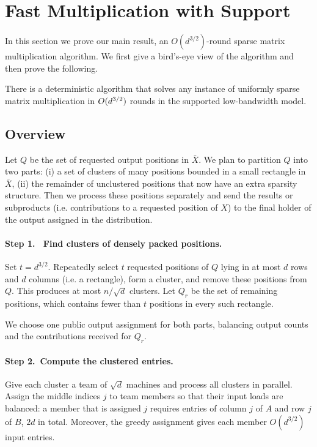 \section{Fast Multiplication with Support} \label{sec:ub}
In this section we prove our main result, an $O(d^{3/2})$-round sparse matrix multiplication algorithm. We first give a bird's-eye view of the algorithm and then prove the following.

\begin{theorem}\label{thm:fs-upper-bound}
	There is a deterministic algorithm that solves any instance of uniformly sparse matrix multiplication in $O(d^{3/2})$ rounds in the supported low-bandwidth model.
\end{theorem}

\subsection{Overview}
Let $Q$ be the set of requested output positions in $\bar{X}$. We plan to partition $Q$ into two parts: (i) a set of clusters of many positions bounded in a small rectangle in $\bar{X}$, (ii) the remainder of unclustered positions that now have an extra sparsity structure. Then we process these positions separately and send the results or subproducts (i.e. contributions to a requested position of $X$) to the final holder of the output assigned in the distribution.


\paragraph{Step 1.~ Find clusters of densely packed positions.}
Set $t=d^{3/2}$. Repeatedly select $t$ requested
positions of $Q$ lying in at most $d$ rows and $d$ columns (i.e. a rectangle), form a cluster, and remove these positions from $Q$.
This produces at most $n/\sqrt d$ clusters. Let $Q_r$ be the set of remaining
positions, which contains fewer than $t$ positions
in every such rectangle.

We choose one public output assignment for both parts, balancing
output counts and the contributions received for $Q_r$.

\paragraph{Step 2.~Compute the clustered entries.}
Give each cluster a team of $\sqrt d$ machines and process all clusters in parallel. Assign the middle indices
$j$ to team members so that their input loads are balanced: a member that is assigned $j$ requires entries of column $j$ of $A$ and row $j$ of $B$, $2d$ in total. Moreover, the greedy assignment gives each member $O(d^{3/2})$ input entries.



